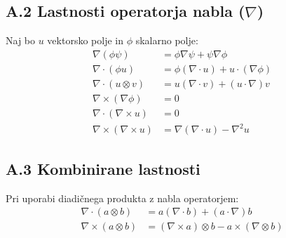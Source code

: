 \documentclass[mat2, tisk]{fmfdelo}
\begin{document}
\subsection*{A.2 Lastnosti operatorja nabla (\(\nabla\))}
Naj bo \(u\) vektorsko polje in \(\phi\) skalarno polje:
\begin{align}
\nabla (\phi \psi) &= \phi \nabla \psi + \psi \nabla \phi \\
\nabla \cdot (\phi u) &= \phi (\nabla \cdot u) + u \cdot (\nabla \phi) \\
\nabla \cdot (u \otimes v) &= u (\nabla \cdot v) + (u \cdot \nabla) v \\
\nabla \times (\nabla \phi) &= 0 \\
\nabla \cdot (\nabla \times u) &= 0 \\
\nabla \times (\nabla \times u) &= \nabla (\nabla \cdot u) - \nabla^2 u
\end{align}

\subsection*{A.3 Kombinirane lastnosti}
Pri uporabi diadičnega produkta z nabla operatorjem:
\begin{align}
\nabla \cdot (a \otimes b) &= a (\nabla \cdot b) + (a \cdot \nabla) b \\
\nabla \times (a \otimes b) &= (\nabla \times a) \otimes b - a \times (\nabla \otimes b)
\end{align}
\end{document}
